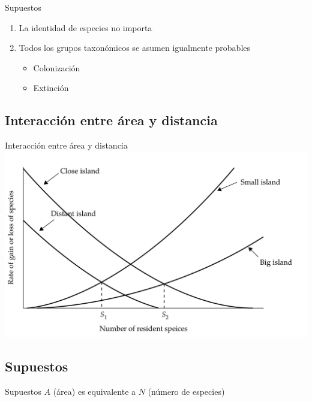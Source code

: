 \documentclass[
  11pt,
  ignorenonframetext,
]{beamer}
\begin{document}
\begin{frame}{Supuestos}
\begin{enumerate}
\item
  La identidad de especies no importa
\item
  Todos los grupos taxonómicos se asumen igualmente probables

  \begin{itemize}
  \item
    Colonización
  \item
    Extinción
  \end{itemize}
\end{enumerate}
\end{frame}

\hypertarget{interacciuxf3n-entre-uxe1rea-y-distancia}{%
\subsection{Interacción entre área y
distancia}\label{interacciuxf3n-entre-uxe1rea-y-distancia}}

\begin{frame}{Interacción entre área y distancia}
\includegraphics{Biogeografia/Distancia.Area.png}
\end{frame}

\hypertarget{supuestos-1}{%
\subsection{Supuestos}\label{supuestos-1}}

\begin{frame}{Supuestos}
\(A\) (área) es equivalente a \(N\) (número de especies)
\end{frame}
\end{document}
